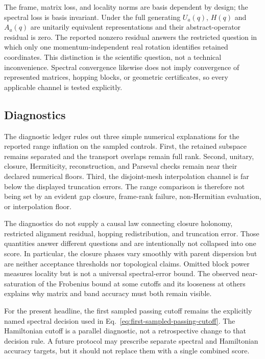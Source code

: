 \documentclass[aps,prb,reprint,amsmath,amssymb,longbibliography,floatfix]{revtex4-2}
\begin{document}
The frame, matrix loss, and locality norms are basis dependent by design; the spectral
loss is basis invariant. Under the full generating $U_a(q)$, $H(q)$ and $A_a(q)$ are
unitarily equivalent representations and their abstract-operator residual is zero. The
reported nonzero residual answers the restricted question in which only one
momentum-independent real rotation identifies retained coordinates. This distinction is
the scientific question, not a technical inconvenience. Spectral convergence likewise
does not imply convergence of represented matrices, hopping blocks, or geometric
certificates, so every applicable channel is tested explicitly.

\subsection{Diagnostics}

The diagnostic ledger rules out three simple numerical explanations for the reported
range inflation on the sampled controls. First, the retained subspace remains separated
and the transport overlaps remain full rank. Second, unitary, closure, Hermiticity,
reconstruction, and Parseval checks remain near their declared numerical floors. Third,
the disjoint-mesh interpolation channel is far below the displayed truncation errors.
The range comparison is therefore not being set by an evident gap closure, frame-rank
failure, non-Hermitian evaluation, or interpolation floor.

The diagnostics do not supply a causal law connecting closure holonomy, restricted
alignment residual, hopping redistribution, and truncation error. Those quantities
answer different questions and are intentionally not collapsed into one score. In
particular, the closure phases vary smoothly with parent dispersion but are neither
acceptance thresholds nor topological claims. Omitted block power measures locality but
is not a universal spectral-error bound. The observed near-saturation of the Frobenius
bound at some cutoffs and its looseness at others explains why matrix and band accuracy
must both remain visible.

For the present headline, the first sampled passing cutoff remains the explicitly named
spectral decision used in Eq.~\eqref{eq:first-sampled-passing-cutoff}. The Hamiltonian
cutoff is a parallel diagnostic, not a retrospective change to that decision rule. A
future protocol may prescribe separate spectral and Hamiltonian accuracy targets, but it
should not replace them with a single combined score.
\end{document}
